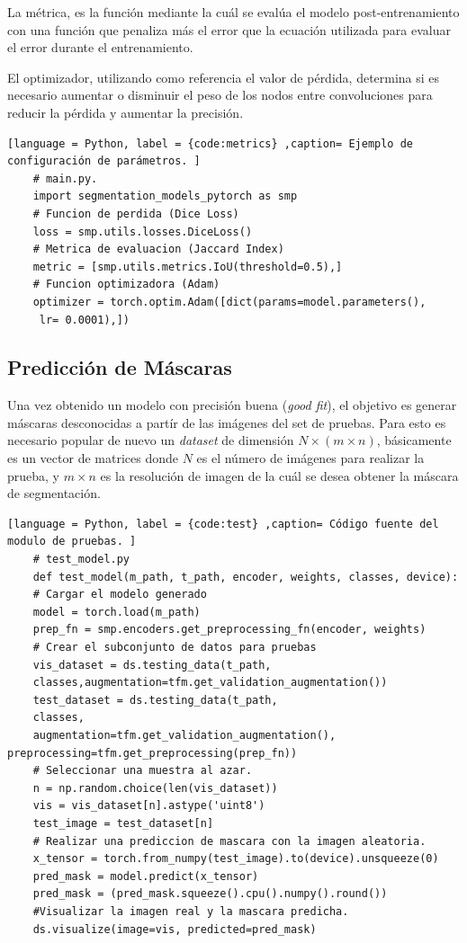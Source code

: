 La métrica, es la función mediante la cuál se evalúa el modelo post-entrenamiento con una función que penaliza más el error que la ecuación utilizada para evaluar el error durante el entrenamiento.

El optimizador, utilizando como referencia el valor de pérdida, determina si es necesario aumentar o disminuir el peso de los nodos entre convoluciones para reducir la pérdida y aumentar la precisión.

\begin{lstlisting}[language = Python, label = {code:metrics} ,caption= Ejemplo de configuración de parámetros. ]
    # main.py.
    import segmentation_models_pytorch as smp
    # Funcion de perdida (Dice Loss)
    loss = smp.utils.losses.DiceLoss() 
    # Metrica de evaluacion (Jaccard Index)
    metric = [smp.utils.metrics.IoU(threshold=0.5),]
    # Funcion optimizadora (Adam)
    optimizer = torch.optim.Adam([dict(params=model.parameters(),
     lr= 0.0001),])
\end{lstlisting}

\subsection{Predicción de Máscaras} 
Una vez obtenido un modelo con precisión buena (\emph{good fit}), el objetivo es generar máscaras desconocidas a partír de las imágenes del set de pruebas. Para esto es necesario popular de nuevo un \emph{dataset} de dimensión $N \times (m \times n)$, básicamente es un vector de matrices donde $N$ es el número de imágenes para realizar la prueba, y $m \times n$ es la resolución de imagen de la cuál se desea obtener la máscara de segmentación.

\begin{lstlisting}[language = Python, label = {code:test} ,caption= Código fuente del modulo de pruebas. ]
    # test_model.py
    def test_model(m_path, t_path, encoder, weights, classes, device):
    # Cargar el modelo generado
    model = torch.load(m_path)
    prep_fn = smp.encoders.get_preprocessing_fn(encoder, weights)
    # Crear el subconjunto de datos para pruebas
    vis_dataset = ds.testing_data(t_path,
    classes,augmentation=tfm.get_validation_augmentation())
    test_dataset = ds.testing_data(t_path,
    classes, 
    augmentation=tfm.get_validation_augmentation(), preprocessing=tfm.get_preprocessing(prep_fn))
    # Seleccionar una muestra al azar.
    n = np.random.choice(len(vis_dataset))
    vis = vis_dataset[n].astype('uint8')
    test_image = test_dataset[n]
    # Realizar una prediccion de mascara con la imagen aleatoria.
    x_tensor = torch.from_numpy(test_image).to(device).unsqueeze(0)
    pred_mask = model.predict(x_tensor)
    pred_mask = (pred_mask.squeeze().cpu().numpy().round())
    #Visualizar la imagen real y la mascara predicha.
    ds.visualize(image=vis, predicted=pred_mask)
\end{lstlisting}

